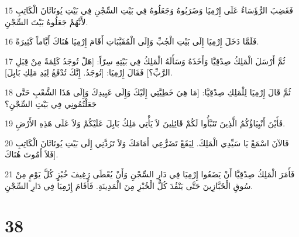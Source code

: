 \par 15 فَغَضِبَ الرُّؤَسَاءُ عَلَى إِرْمِيَا وَضَرَبُوهُ وَجَعَلُوهُ فِي بَيْتِ السِّجْنِ فِي بَيْتِ يُونَاثَانَ الْكَاتِبِ لأَنَّهُمْ جَعَلُوهُ بَيْتَ السِّجْنِ.
\par 16 فَلَمَّا دَخَلَ إِرْمِيَا إِلَى بَيْتِ الْجُبِّ وَإِلَى الْمُقَبَّبَاتِ أَقَامَ إِرْمِيَا هُنَاكَ أَيَّاماً كَثِيرَةً.
\par 17 ثُمَّ أَرْسَلَ الْمَلِكُ صِدْقِيَّا وَأَخَذَهُ وَسَأَلَهُ الْمَلِكُ فِي بَيْتِهِ سِرّاً: [هَلْ تُوجَدُ كَلِمَةٌ مِنْ قِبَلِ الرَّبِّ؟] فَقَالَ إِرْمِيَا: [تُوجَدُ. إِنَّكَ تُدْفَعُ لِيَدِ مَلِكِ بَابِلَ].
\par 18 ثُمَّ قَالَ إِرْمِيَا لِلْمَلِكِ صِدْقِيَّا: [مَا هِيَ خَطِيَّتِي إِلَيْكَ وَإِلَى عَبِيدِكَ وَإِلَى هَذَا الشَّعْبِ حَتَّى جَعَلْتُمُونِي فِي بَيْتِ السِّجْنِ؟
\par 19 فَأَيْنَ أَنْبِيَاؤُكُمُ الَّذِينَ تَنَبَّأُوا لَكُمْ قَائِلِينَ لاَ يَأْتِي مَلِكُ بَابِلَ عَلَيْكُمْ وَلاَ عَلَى هَذِهِ الأَرْضِ.
\par 20 فَالآنَ اسْمَعْ يَا سَيِّدِي الْمَلِكَ. لِيَقَعْ تَضَرُّعِي أَمَامَكَ وَلاَ تَرُدَّنِي إِلَى بَيْتِ يُونَاثَانَ الْكَاتِبِ فَلاَ أَمُوتَ هُنَاكَ].
\par 21 فَأَمَرَ الْمَلِكُ صِدْقِيَّا أَنْ يَضَعُوا إِرْمِيَا فِي دَارِ السِّجْنِ وَأَنْ يُعْطَى رَغِيفَ خُبْزٍ كُلَّ يَوْمٍ مِنْ سُوقِ الْخَبَّازِينَ حَتَّى يَنْفُدَ كُلُّ الْخُبْزِ مِنَ الْمَدِينَةِ. فَأَقَامَ إِرْمِيَا فِي دَارِ السِّجْنِ.

\chapter{38}

